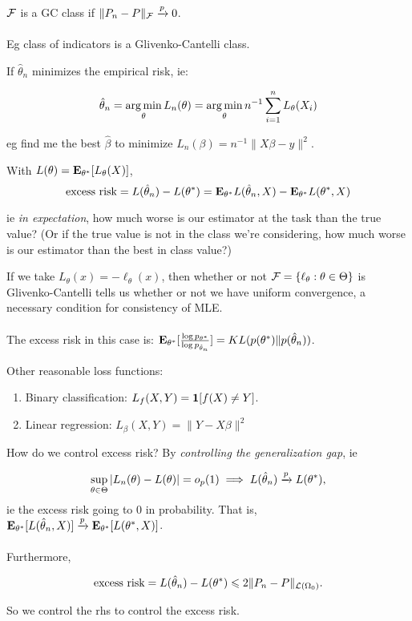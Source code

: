 \documentclass{article}
\begin{document}
\begin{definition}
$\mathcal F$ is a GC class if $\|P_n - P\|_\mathcal F \xrightarrow{p} 0$. \\\\Eg class of indicators is a Glivenko-Cantelli class. 
\end{definition}
If $\hat \theta_n$ minimizes the empirical risk, ie:

$$\hat \theta_n = \operatorname*{arg\,min}_\theta L_n(\theta) = \operatorname*{arg\,min}_\theta n^{-1} \sum_{i=1}^n L_\theta(X_i)$$

eg find me the best $\hat \beta$ to minimize $L_n (\beta) = n^{-1} \|X\beta - y\|^2$. 
\begin{definition}

With $L(\theta) = \mathbf{E}_{\theta^*} [L_\theta(X)]$, 
$$\text{excess risk} = L(\hat \theta_n) - L(\theta^*) = \mathbf{E}_{\theta^*} L(\hat \theta_n , X) - \mathbf{E}_{\theta^*} L(\theta^*,X)$$

ie \textit{in expectation}, how much worse is our estimator at the task than the true value? (Or if the true value is not in the class we're considering, how much worse is our estimator than the best in class value?) 
\end{definition}

\begin{example}[MLE]
If we take $L_\theta(x) = -\ell_\theta(x)$, then whether or not $\mathcal F = \{\ell_\theta: \theta\in \Theta\}$ is Glivenko-Cantelli tells us whether or not we have uniform convergence, a necessary condition for consistency of MLE. \\\\

The excess risk in this case is: $\mathbf{E}_{\theta^*} [\frac{\log p_{\theta^*}}{\log p_{\hat \theta_n}}] = KL(p(\theta^*)\|p(\hat \theta_n))$. 
\end{example}

Other reasonable loss functions:
\begin{enumerate}
	\item Binary classification: $L_f(X,Y) = \boldsymbol{1}[f(X) \neq Y]$. 
	\item Linear regression: $L_\beta (X,Y) = \|Y-X\beta\|^2$
\end{enumerate}

\begin{fact}
How do we control excess risk? By \textit{controlling the generalization gap}, ie

$$\sup_{\theta\in\Theta} |L_n (\theta) - L(\theta)| = o_p(1) \implies L(\hat \theta_n) \xrightarrow{p} L(\theta^*),$$
ie the excess risk going to $0$ in probability. That is, $\mathbf{E}_{\theta^*} [L(\hat \theta_n, X)] \xrightarrow{p} \mathbf{E}_{\theta^*} [L(\theta^* ,X)]$. \\\\Furthermore,

$$\text{excess risk} = L(\hat \theta_n) - L(\theta^*) \leqslant 2\|P_n -P\|_{\mathcal L(\Omega_0)}.$$

So we control the rhs to control the excess risk. 

 
\end{fact}
\end{document}
